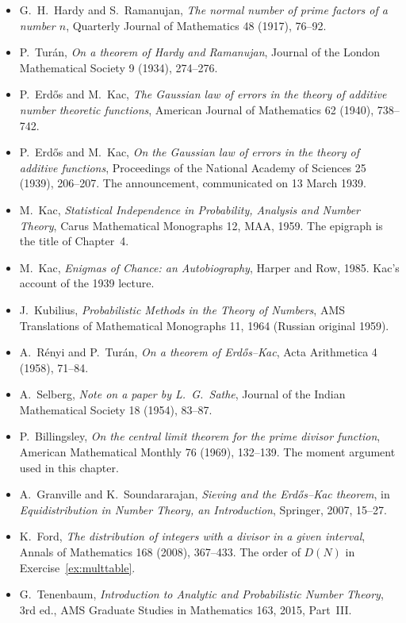 \begin{itemize}
\item G.~H.~Hardy and S.~Ramanujan, \emph{The normal number of prime factors of a number $n$}, Quarterly Journal of Mathematics 48 (1917), 76--92.
\item P.~Turán, \emph{On a theorem of Hardy and Ramanujan}, Journal of the London Mathematical Society 9 (1934), 274--276.
\item P.~Erd\H{o}s and M.~Kac, \emph{The Gaussian law of errors in the theory of additive number theoretic functions}, American Journal of Mathematics 62 (1940), 738--742.
\item P.~Erd\H{o}s and M.~Kac, \emph{On the Gaussian law of errors in the theory of additive functions}, Proceedings of the National Academy of Sciences 25 (1939), 206--207. The announcement, communicated on 13 March 1939.
\item M.~Kac, \emph{Statistical Independence in Probability, Analysis and Number Theory}, Carus Mathematical Monographs 12, MAA, 1959. The epigraph is the title of Chapter~4.
\item M.~Kac, \emph{Enigmas of Chance: an Autobiography}, Harper and Row, 1985. Kac's account of the 1939 lecture.
\item J.~Kubilius, \emph{Probabilistic Methods in the Theory of Numbers}, AMS Translations of Mathematical Monographs 11, 1964 (Russian original 1959).
\item A.~Rényi and P.~Turán, \emph{On a theorem of Erd\H{o}s--Kac}, Acta Arithmetica 4 (1958), 71--84.
\item A.~Selberg, \emph{Note on a paper by L.~G.~Sathe}, Journal of the Indian Mathematical Society 18 (1954), 83--87.
\item P.~Billingsley, \emph{On the central limit theorem for the prime divisor function}, American Mathematical Monthly 76 (1969), 132--139. The moment argument used in this chapter.
\item A.~Granville and K.~Soundararajan, \emph{Sieving and the Erd\H{o}s--Kac theorem}, in \emph{Equidistribution in Number Theory, an Introduction}, Springer, 2007, 15--27.
\item K.~Ford, \emph{The distribution of integers with a divisor in a given interval}, Annals of Mathematics 168 (2008), 367--433. The order of $D(N)$ in Exercise~\ref{ex:multtable}.
\item G.~Tenenbaum, \emph{Introduction to Analytic and Probabilistic Number Theory}, 3rd ed., AMS Graduate Studies in Mathematics 163, 2015, Part~III.
\end{itemize}

